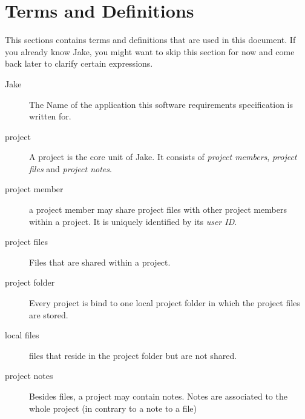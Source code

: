 \section{Terms and Definitions}
This sections contains terms and definitions that are used in this document. If you 
already know Jake, you might want to skip this section for now and come back later to clarify certain expressions.
\begin{description}

\item[Jake] The Name of the application this software requirements specification is written for.
\item[project] A project is the core unit of Jake. It consists of \emph{project members}, \emph{project files} and \emph{project notes}.
\item[project member] a project member may share project files with other project members within a project. It is uniquely identified by its \emph{user ID}.
\item[project files] Files that are shared within a project.
\item[project folder] Every project is bind to one local project folder in which the project files are stored.
\item[local files] files that reside in the project folder but are not shared.
\item[project notes] Besides files, a project may contain notes. Notes are associated to the whole project (in contrary to a note to a file)


\end{description}

